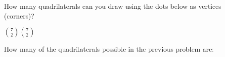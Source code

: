 \begin{questions}
\begin{answer}
  \end{answer}



\question How many quadrilaterals can you draw using the dots below as vertices (corners)?

\begin{center}
\end{center}

  \begin{answer}
    ${7\choose 2}{7\choose 2}$
  \end{answer}



\question How many of the quadrilaterals possible in the previous problem are:
\begin{multicols}{4}
\end{multicols}

  \begin{answer}
\end{answer}
\end{questions}
